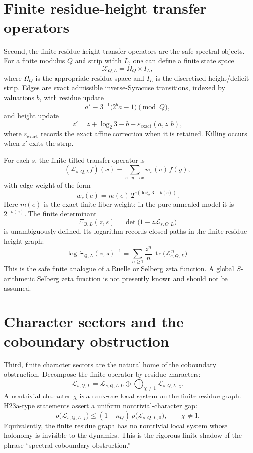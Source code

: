 \documentclass[11pt]{article}
\newcommand{\Xcal}{\mathcal{X}}
\newcommand{\Lcal}{\mathcal{L}}
\newcommand{\Om}{\Omega}
\DeclareMathOperator{\tr}{tr}
\theoremstyle{remark}
\begin{document}
\section{Finite residue-height transfer operators}

Second, the finite residue-height transfer operators are the safe spectral objects. For a
finite modulus $Q$ and strip width $L$, one can define a finite state space
\[
\Xcal_{Q,L} = \Om_Q \times I_L,
\]
where $\Om_Q$ is the appropriate residue space and $I_L$ is the discretized height/deficit
strip. Edges are exact admissible inverse-Syracuse transitions, indexed by valuations $b$,
with residue update
\[
a' \equiv 3^{-1}\bigl(2^b a - 1\bigr) \pmod Q,
\]
and height update
\[
z' = z + \log_2 3 - b + \varepsilon_{\mathrm{exact}}(a,z,b),
\]
where $\varepsilon_{\mathrm{exact}}$ records the exact affine correction when it is
retained. Killing occurs when $z'$ exits the strip.

For each $s$, the finite tilted transfer operator is
\[
(\Lcal_{s,Q,L} f)(x) = \sum_{e\,:\,y\to x} w_s(e)\, f(y),
\]
with edge weight of the form
\[
w_s(e) = m(e)\, 2^{s(\log_2 3 - b(e))}.
\]
Here $m(e)$ is the exact finite-fiber weight; in the pure annealed model it is
$2^{-b(e)}$. The finite determinant
\[
\Xi_{Q,L}(z,s) = \det\!\bigl(1 - z\Lcal_{s,Q,L}\bigr)
\]
is unambiguously defined. Its logarithm records closed paths in the finite residue-height
graph:
\[
\log \Xi_{Q,L}(z,s)^{-1} = \sum_{n\ge1} \frac{z^n}{n}\, \tr\!\bigl(\Lcal_{s,Q,L}^{\,n}\bigr).
\]
This is the safe finite analogue of a Ruelle or Selberg zeta function. A global
$S$-arithmetic Selberg zeta function is not presently known and should not be assumed.

\section{Character sectors and the coboundary obstruction}

Third, finite character sectors are the natural home of the coboundary obstruction.
Decompose the finite operator by residue characters:
\[
\Lcal_{s,Q,L} = \Lcal_{s,Q,L,0} \oplus \bigoplus_{\chi\ne 1} \Lcal_{s,Q,L,\chi}.
\]
A nontrivial character $\chi$ is a rank-one local system on the finite residue graph.
\textsf{H23a}-type statements assert a uniform nontrivial-character gap:
\[
\rho\bigl(\Lcal_{s,Q,L,\chi}\bigr) \le (1-\kappa_Q)\,\rho\bigl(\Lcal_{s,Q,L,0}\bigr),
\qquad \chi\ne 1.
\]
Equivalently, the finite residue graph has no nontrivial local system whose holonomy is
invisible to the dynamics. This is the rigorous finite shadow of the phrase
``spectral-coboundary obstruction.''
\end{document}
